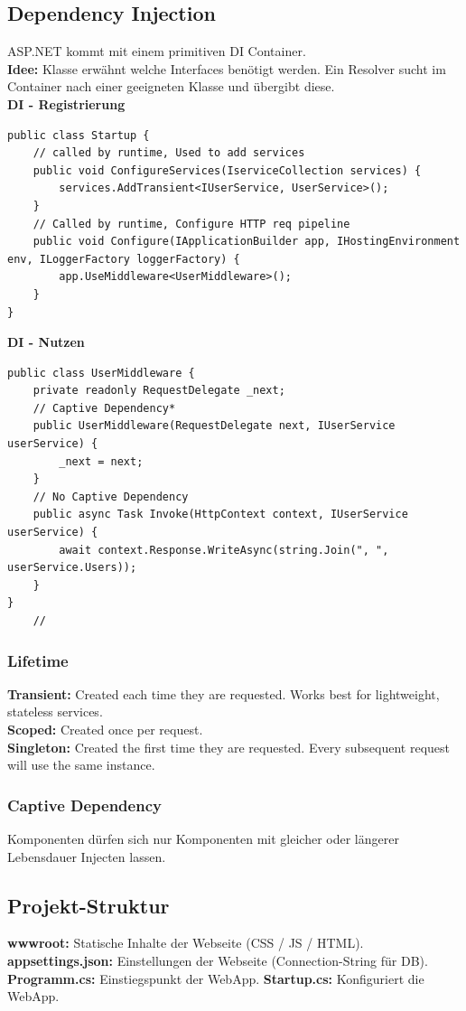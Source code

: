 \subsection{Dependency Injection}
ASP.NET kommt mit einem primitiven DI Container.\\
\textbf{Idee:} Klasse erwähnt welche Interfaces benötigt werden.
Ein Resolver sucht im Container nach einer geeigneten Klasse und übergibt diese.\\
\textbf{DI - Registrierung}
\begin{lstlisting}
public class Startup {
    // called by runtime, Used to add services
    public void ConfigureServices(IserviceCollection services) {
        services.AddTransient<IUserService, UserService>();
    }
    // Called by runtime, Configure HTTP req pipeline
    public void Configure(IApplicationBuilder app, IHostingEnvironment env, ILoggerFactory loggerFactory) {
        app.UseMiddleware<UserMiddleware>();
    }
}
\end{lstlisting}
\textbf{DI - Nutzen}
\begin{lstlisting}
public class UserMiddleware {
    private readonly RequestDelegate _next;
    // Captive Dependency*
    public UserMiddleware(RequestDelegate next, IUserService userService) {
        _next = next;
    }
    // No Captive Dependency
    public async Task Invoke(HttpContext context, IUserService userService) {
        await context.Response.WriteAsync(string.Join(", ", userService.Users));
    }
}
    //
\end{lstlisting}
\subsubsection{Lifetime}
\textbf{Transient:} Created each time they are requested.
Works best for lightweight, stateless services.\\
\textbf{Scoped:} Created once per request.\\
\textbf{Singleton:} Created the first time they are requested.
Every subsequent request will use the same instance.\\
\subsubsection{Captive Dependency}
Komponenten dürfen sich nur Komponenten mit gleicher oder längerer Lebensdauer Injecten lassen.

\subsection{Projekt-Struktur}
\textbf{wwwroot:} Statische Inhalte der Webseite (CSS / JS / HTML).
\textbf{appsettings.json:} Einstellungen der Webseite (Connection-String für DB).
\textbf{Programm.cs:} Einstiegspunkt der WebApp.
\textbf{Startup.cs:} Konfiguriert die WebApp.


